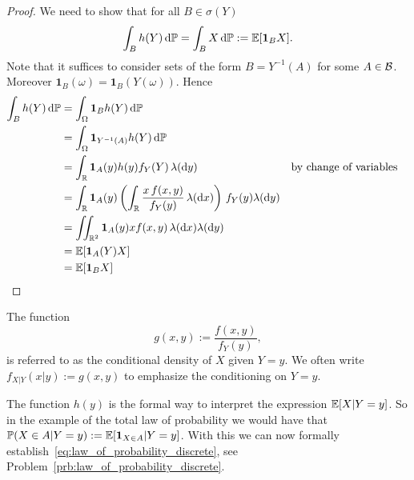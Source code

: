 \begin{proof}
We need to show that for all $B \in \sigma(Y)$
\[
	\int_B h(Y) \, \mathrm{d} \mathbb P = \int_B X \, \mathrm{d} \mathbb P := \mathbb E[\mathbf{1}_B X]. 
\]
Note that it suffices to consider sets of the form $B = Y^{-1}(A)$ for some $A \in \mathcal B$. Moreover $\mathbf{1}_B(\omega) = \mathbf{1}_B(Y(\omega))$. Hence
\begin{align*}
	\int_B h(Y) \, \mathrm{d} \mathbb P &= \int_\Omega \mathbf{1}_{B} h(Y) \, \mathrm{d} \mathbb P \\
	&= \int_\Omega \mathbf{1}_{Y^{-1}(A)} h(Y) \, \mathrm{d} \mathbb P \\
	&= \int_{\mathbb R} \mathbf{1}_{A}(y) h(y) f_Y(Y) \, \lambda (\mathrm{d} y) &&\text{by change of variables}\\
	&= \int_{\mathbb R} \mathbf{1}_A(y) \left(\int_{\mathbb R} \frac{x \, f(x,y)}{f_Y(y)} \, \lambda(\mathrm{d} x)\right)
		\, f_Y(y) \lambda(\mathrm{d} y)\\
	&= \iint_{\mathbb R^2} \mathbf{1}_A(y) x f(x,y) \, \lambda(\mathrm{d} x) \lambda(\mathrm{d} y)\\
	&= \mathbb E[\mathbf{1}_A(Y) X]\\
	&= \mathbb E[\mathbf{1}_B X] 
\end{align*}
\end{proof}

The function
\begin{equation}
	g(x,y) := \frac{f(x,y)}{f_Y(y)},
\end{equation}
is referred to as the conditional density of $X$ given $Y = y$. We often write $f_{X|Y}(x|y) := g(x,y)$ to emphasize the conditioning on $Y = y$.

The function $h(y)$ is the formal way to interpret the expression $\mathbb E[X | Y=y]$. So in the example of the total law of probability we would have that $\mathbb P(X\in A | Y = y) := \mathbb E[\mathbf{1}_{X \in A} | Y = y]$. With this we can now formally establish~\eqref{eq:law_of_probability_discrete}, see Problem~\ref{prb:law_of_probability_discrete}.


